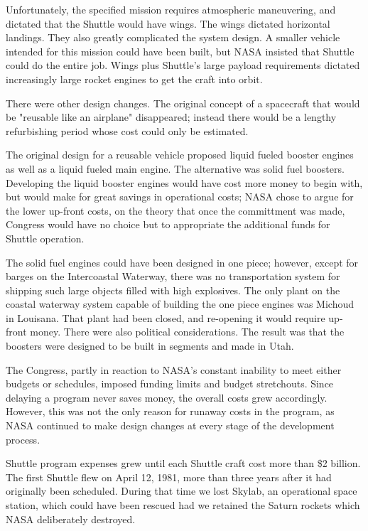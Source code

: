 \documentclass[a4paper,12pt]{book}
\begin{document}
Unfortunately, the specified mission requires atmospheric maneuvering, and dictated that the Shuttle would have wings. The wings dictated horizontal landings. They also greatly complicated the system design. A smaller vehicle intended for this mission could have been built, but NASA insisted that Shuttle could do the entire job. Wings plus Shuttle's large payload requirements dictated increasingly large rocket engines to get the craft into orbit.

There were other design changes. The original concept of a spacecraft that would be "reusable like an airplane" disappeared; instead there would be a lengthy refurbishing period whose cost could only be estimated.

The original design for a reusable vehicle proposed liquid fueled booster engines as well as a liquid fueled main engine. The alternative was solid fuel boosters. Developing the liquid booster engines would have cost more money to begin with, but would make for great savings in operational costs; NASA chose to argue for the lower up-front costs, on the theory that once the committment was made, Congress would have no choice but to appropriate the additional funds for Shuttle operation.

The solid fuel engines could have been designed in one piece; however, except for barges on the Intercoastal Waterway, there was no transportation system for shipping such large objects filled with high explosives. The only plant on the coastal waterway system capable of building the one piece engines was Michoud in Louisana. That plant had been closed, and re-opening it would require up-front money. There were also political considerations. The result was that the boosters were designed to be built in segments and made in Utah.

The Congress, partly in reaction to NASA's constant inability to meet either budgets or schedules, imposed funding limits and budget stretchouts. Since delaying a program never saves money, the overall costs grew accordingly. However, this was not the only reason for runaway costs in the program, as NASA continued to make design changes at every stage of the development process.

Shuttle program expenses grew until each Shuttle craft cost more than \$2 billion. The first Shuttle flew on April 12, 1981, more than three years after it had originally been scheduled. During that time we lost Skylab, an operational space station, which could have been rescued had we retained the Saturn rockets which NASA deliberately destroyed.
\end{document}
